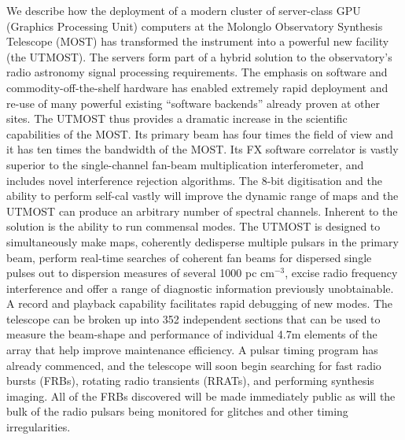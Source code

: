 We describe how the deployment of a modern cluster of server-class GPU (Graphics Processing Unit) computers at the Molonglo Observatory Synthesis Telescope (MOST) has transformed the instrument into a powerful new facility (the UTMOST). The servers form part of a hybrid solution to the observatory's radio astronomy signal processing requirements. The emphasis on software and commodity-off-the-shelf hardware has enabled extremely rapid deployment and re-use of many powerful existing ``software backends'' already proven at other sites. The UTMOST thus provides a dramatic increase in the scientific capabilities of the MOST. Its primary beam has four times the field of view and it has ten times the bandwidth of the MOST. Its FX software correlator is vastly superior to the single-channel fan-beam multiplication interferometer, and includes novel interference rejection algorithms. The 8-bit digitisation and the ability to perform self-cal vastly will improve the dynamic range of maps and the UTMOST can produce an arbitrary number of spectral channels. Inherent to the solution is the ability to run commensal modes. The UTMOST is designed to simultaneously make maps, coherently dedisperse multiple pulsars in the primary beam, perform real-time searches of coherent fan beams for dispersed single pulses out to dispersion measures of several 1000 pc cm$^{-3}$, excise radio frequency interference and offer a range of diagnostic information previously unobtainable. A record and playback capability facilitates rapid debugging of new modes. The telescope can be broken up into 352 independent sections that can be used to measure the beam-shape and performance of individual 4.7m elements of the array that help improve maintenance efficiency. A pulsar timing program has already commenced, and the telescope will soon begin searching for fast radio bursts (FRBs), rotating radio transients (RRATs), and performing synthesis imaging. All of the FRBs discovered will be made immediately public as will the bulk of the radio pulsars being monitored for glitches and other timing irregularities. 
